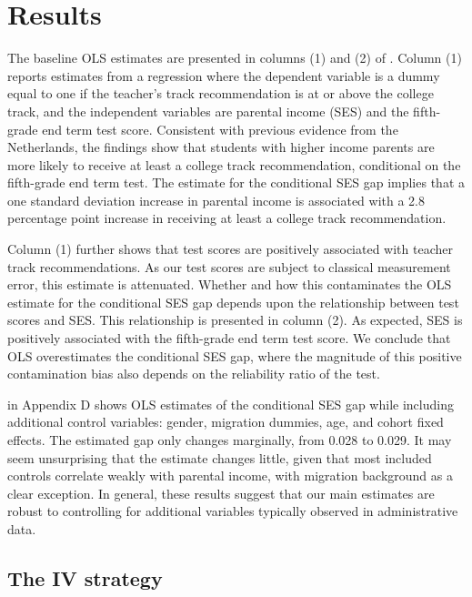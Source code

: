 \section{Results}\label{sec:Results}

The baseline OLS estimates are presented in columns (1) and (2) of . Column (1) reports estimates from a regression where the dependent variable is a dummy equal to one if the teacher’s track recommendation is at or above the college track, and the independent variables are parental income (SES) and the fifth-grade end term test score. Consistent with previous evidence from the Netherlands, the findings show that students with higher income parents are more likely to receive at least a college track recommendation, conditional on the fifth-grade end term test. The estimate for the conditional SES gap implies that a one standard deviation increase in parental income is associated with a 2.8 percentage point increase in receiving at least a college track recommendation.

Column (1) further shows that test scores are positively associated with teacher track recommendations. As our test scores are subject to classical measurement error, this estimate is attenuated. Whether and how this contaminates the OLS estimate for the conditional SES gap depends upon the relationship between test scores and SES. This relationship is presented in column (2). As expected, SES is positively associated with the fifth-grade end term test score. We conclude that OLS overestimates the conditional SES gap, where the magnitude of this positive contamination bias also depends on the reliability ratio of the test.

 in Appendix D shows OLS estimates of the conditional SES gap while including additional control variables: gender, migration dummies, age, and cohort fixed effects. The estimated gap only changes marginally, from 0.028 to 0.029. It may seem unsurprising that the estimate changes little, given that most included controls correlate weakly with parental income, with migration background as a clear exception.
In general, these results suggest that our main estimates are robust to controlling for additional variables typically observed in administrative data.



\subsection{The IV strategy}

